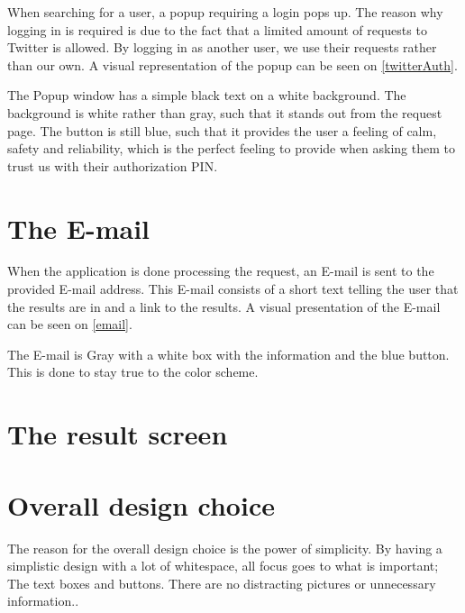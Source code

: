 When searching for a user, a popup requiring a login pops up. The reason why
logging in is required is due to the fact that a limited amount of requests to
Twitter is allowed. By logging in as another user, we use their requests rather
than our own. A visual representation of the popup can be seen on
\autoref{twitterAuth}.


The Popup window has a simple black text on a white background. The background
is white rather than gray, such that it stands out from the request page. The
button is still blue, such that it provides the user a feeling of calm, safety
and reliability, which is the perfect feeling to provide when asking them to
trust us with their authorization PIN\citep[p. 61]{WebUI}.

\section{The E-mail}
When the application is done processing the request, an E-mail is sent to the
provided E-mail address. This E-mail consists of a short text telling the user
that the results are in and a link to the results. A visual presentation of the
E-mail can be seen on \autoref{email}.


The E-mail is Gray with a white box with the information and the blue button.
This is done to stay true to the color scheme. 

\section{The result screen}

\section{Overall design choice}
The reason for the overall design choice is the power of simplicity. By having a
simplistic design with a lot of whitespace, all focus goes to what is
important; The text boxes and buttons. There are no distracting
pictures or unnecessary information.\citep[p. 26 \& 32]{WebUI}.\\